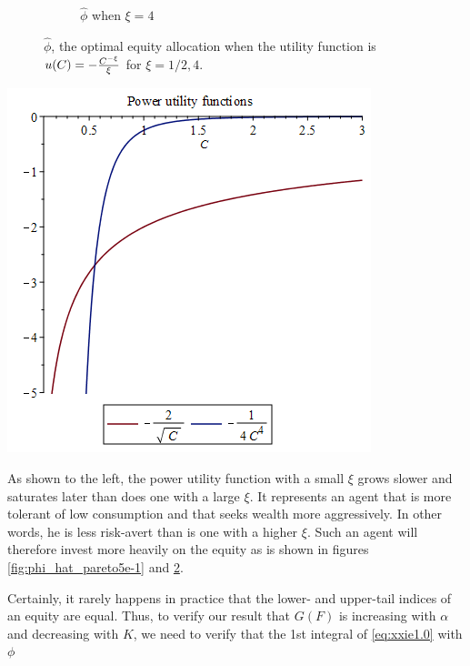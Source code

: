 \documentclass{article}
\begin{document}
\begin{figure}
\begin{subfigure}[b]{0.5\linewidth}
    \caption{$\hat\phi$ when $\xi = 4$}
    \label{fig:phi_hat_pareto4}
  \end{subfigure}
  \caption{$\hat\phi$, the optimal equity allocation when the utility
    function is $u(C) = -{C^{-\xi} \over \xi}$ for $\xi = 1/2, 4$.
  }
\end{figure}

\begin{minipage}{0.5\linewidth}
  \includegraphics[width=\textwidth]{power_utilities.png}
\end{minipage}\hfill
\begin{minipage}{0.42\textwidth}
  As shown to the left, the power utility function with a small
  $\xi$ grows slower and saturates later than does one with a large
  $\xi$. It represents an agent that is more tolerant of low
  consumption and that seeks wealth more aggressively. In other
  words, he is less risk-avert than is one with a higher $\xi$.
  Such an agent will therefore invest more heavily on the equity as
  is shown in figures \ref{fig:phi_hat_pareto5e-1} and
  \ref{fig:phi_hat_pareto4}.
\end{minipage}
Certainly, it rarely happens in practice that the lower- and
upper-tail indices of an equity are equal. Thus, to verify our result
that $G(F)$ is increasing with $\alpha$ and decreasing with $K$, we
need to verify that the 1st integral of \eqref{eq:xxie1.0} with $\phi$
\end{document}
